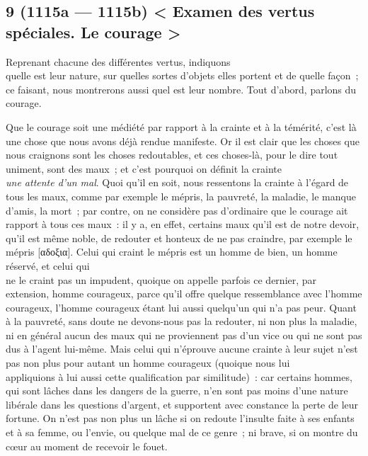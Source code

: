\documentclass[french,twoside]{book} %
\begin{document}
\subsection[{9 (1115a — 1115b) < Examen des vertus spéciales. Le courage >}]{9 (1115a — 1115b) < Examen des vertus spéciales. Le courage >}
\noindent  Reprenant chacune des différentes vertus, indiquons \\
quelle est leur nature, sur quelles sortes d’objets elles portent et de quelle façon ; ce faisant, nous montrerons aussi quel est leur nombre. Tout d’abord, parlons du courage.\par
Que le courage soit une médiété par rapport à la crainte et à la témérité, c’est là une chose que nous avons déjà rendue manifeste. Or il est clair que les choses que nous craignons sont les choses redoutables, et ces choses-là, pour le dire tout uniment, sont des maux ; et c’est pourquoi on définit la crainte \\
{\itshape une attente d’un mal}. Quoi qu’il en soit, nous ressentons la crainte à l’égard de tous les maux, comme par exemple le mépris, la pauvreté, la maladie, le manque d’amis, la mort ; par contre, on ne considère pas d’ordinaire que le courage ait rapport à tous ces maux : il y a, en effet, certains maux qu’il est de notre devoir, qu’il est même noble, de redouter et honteux de ne pas craindre, par exemple le mépris [αδοξια]. Celui qui craint le mépris est un homme de bien, un homme réservé, et celui qui \\
ne le craint pas un impudent, quoique on appelle parfois ce dernier, par extension, homme courageux, parce qu’il offre quelque ressemblance avec l’homme courageux, l’homme courageux étant lui aussi quelqu’un qui n’a pas peur. Quant à la pauvreté, sans doute ne devons-nous pas la redouter, ni non plus la maladie, ni en général aucun des maux qui ne proviennent pas d’un vice ou qui ne sont pas dus à l’agent lui-même. Mais celui qui n’éprouve aucune crainte à leur sujet n’est pas non plus pour autant un homme courageux (quoique nous lui \\
appliquions à lui aussi cette qualification par similitude) : car certains hommes, qui sont lâches dans les dangers de la guerre, n’en sont pas moins d’une nature libérale dans les questions d’argent, et supportent avec constance la perte de leur fortune. On n’est pas non plus un lâche si on redoute l’insulte faite à ses enfants et à sa femme, ou l’envie, ou quelque mal de ce genre ; ni brave, si on montre du cœur au moment de recevoir le fouet.\par
\end{document}
